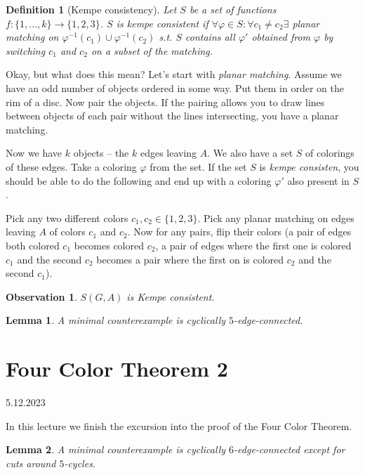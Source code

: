 \documentclass{article}
\newtheorem*{definition}{Definition}
\newtheorem*{lemma}{Lemma}
\newtheorem*{observation}{Observation}
\begin{document}
\begin{definition}[Kempe consistency]
	Let $S$ be a set of functions $f: \{1,...,k\} \rightarrow \{1,2,3\}$.
	$S$ is \emph{kempe consistent} if
	$\forall \varphi \in S: \forall c_1 \neq c_2 \exists$ planar matching
	on $\varphi^{-1}(c_1) \cup \varphi^{-1}(c_2)$ s.t. $S$ contains all
	$\varphi'$ obtained from $\varphi$ by switching $c_1$ and $c_2$ on a
	subset of the matching.
\end{definition}

\noindent
Okay, but what does this mean? Let's start with \emph{planar matching}. Assume
we have an odd number of objects ordered in some way. Put them in order on the
rim of a disc. Now pair the objects. If the pairing allows you to draw lines
between objects of each pair without the lines intersecting, you have a planar
matching.

Now we have $k$ objects -- the $k$ edges leaving $A$. We also
have a set $S$ of colorings of these edges. Take a coloring $\varphi$
from the set. If the set $S$ is \emph{kempe consisten}, you should be able to
do the following and end up with a coloring $\varphi'$ also present in $S$.

Pick any two different colors $c_1,c_2 \in \{1,2,3\}$. Pick any planar matching
on edges leaving $A$ of colors $c_1$ and $c_2$. Now for any pairs, flip their
colors (a pair of edges both colored $c_1$ becomes colored $c_2$, a pair of
edges where the first one is colored $c_1$ and the second $c_2$ becomes a pair
where the first on is colored $c_2$ and the second $c_1$).

\begin{observation}
	$S(G, A)$ is Kempe consistent.
\end{observation}

\begin{lemma}
	A minimal counterexample is cyclically $5$-edge-connected.
\end{lemma}


\newpage
\section{Four Color Theorem 2} %
5.12.2023

\noindent
In this lecture we finish the excursion into the proof of the Four Color
Theorem.

\begin{lemma}
	A minimal counterexample is cyclically $6$-edge-connected except for
	cuts around $5$-cycles.
\end{lemma}
\end{document}
